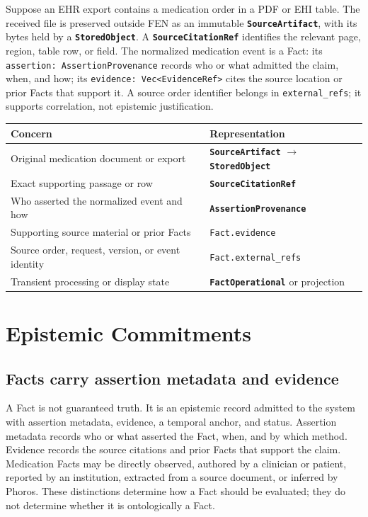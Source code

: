 \documentclass[11pt]{article}
\newcommand{\entity}[1]{\texttt{\textbf{#1}}}
\newcommand{\field}[1]{\texttt{#1}}
\begin{document}
Suppose an EHR export contains a medication order in a PDF or EHI table. The
received file is preserved outside FEN as an immutable
\entity{SourceArtifact}, with its bytes held by a \entity{StoredObject}. A
\entity{SourceCitationRef} identifies the relevant page, region, table row, or
field. The normalized medication event is a Fact: its
\field{assertion: AssertionProvenance} records who or what admitted the claim,
when, and how; its \field{evidence: Vec<EvidenceRef>} cites the source location
or prior Facts that support it. A source order identifier belongs in
\field{external\_refs}; it supports correlation, not epistemic justification.

\begin{center}
\small
\renewcommand{\arraystretch}{1.12}
\begin{tabular}{>{\raggedright\arraybackslash}p{4.8cm} >{\raggedright\arraybackslash}p{8.0cm}}
\toprule
\textbf{Concern} & \textbf{Representation} \\
\midrule
Original medication document or export & \entity{SourceArtifact} $\rightarrow$ \entity{StoredObject} \\
Exact supporting passage or row & \entity{SourceCitationRef} \\
Who asserted the normalized event and how & \entity{AssertionProvenance} \\
Supporting source material or prior Facts & \field{Fact.evidence} \\
Source order, request, version, or event identity & \field{Fact.external\_refs} \\
Transient processing or display state & \entity{FactOperational} or projection \\
\bottomrule
\end{tabular}
\end{center}

\section{Epistemic Commitments}
\label{sec:epistemic-commitments}

\subsection{Facts carry assertion metadata and evidence}

A Fact is not guaranteed truth. It is an epistemic record admitted to the
system with assertion metadata, evidence, a temporal anchor, and status.
Assertion metadata records who or what asserted the Fact, when, and by which
method. Evidence records the source citations and prior Facts that support the
claim. Medication
Facts may be directly observed, authored by a clinician or patient, reported
by an institution, extracted from a source document, or inferred by Phoros.
These distinctions determine how a Fact should be evaluated; they do not
determine whether it is ontologically a Fact.
\end{document}
